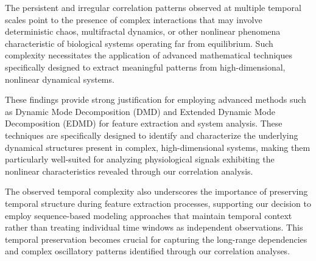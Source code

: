 \documentclass[a4paper,12pt,twoside]{article}
\begin{document}
The persistent and irregular correlation patterns observed at multiple temporal scales point to the presence of complex interactions that may involve deterministic chaos, multifractal dynamics, or other nonlinear phenomena characteristic of biological systems operating far from equilibrium. Such complexity necessitates the application of advanced mathematical techniques specifically designed to extract meaningful patterns from high-dimensional, nonlinear dynamical systems.

These findings provide strong justification for employing advanced methods such as Dynamic Mode Decomposition (DMD) and Extended Dynamic Mode Decomposition (EDMD) for feature extraction and system analysis. These techniques are specifically designed to identify and characterize the underlying dynamical structures present in complex, high-dimensional systems, making them particularly well-suited for analyzing physiological signals exhibiting the nonlinear characteristics revealed through our correlation analysis.

The observed temporal complexity also underscores the importance of preserving temporal structure during feature extraction processes, supporting our decision to employ sequence-based modeling approaches that maintain temporal context rather than treating individual time windows as independent observations. This temporal preservation becomes crucial for capturing the long-range dependencies and complex oscillatory patterns identified through our correlation analyses.  
\end{document}
